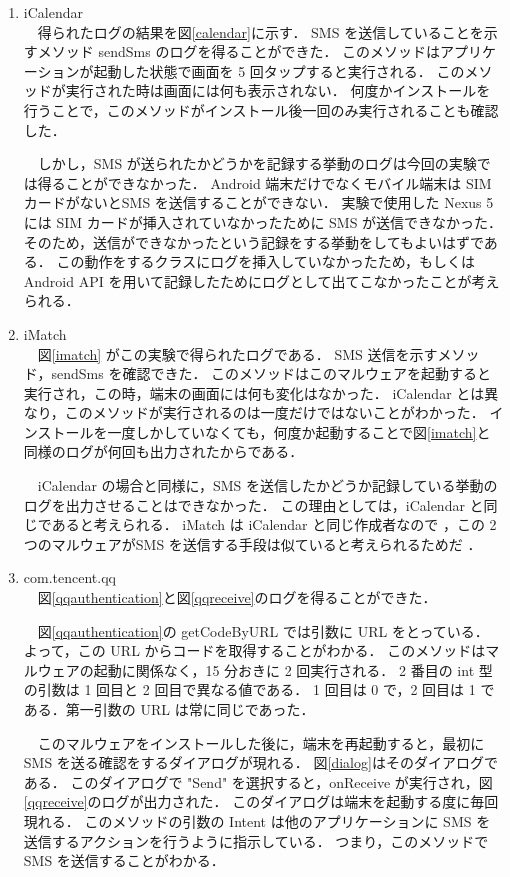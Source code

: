 \begin{enumerate}
\item iCalendar \mbox{}\\
	\ \ 得られたログの結果を図\ref{calendar}に示す．
	SMS を送信していることを示すメソッド sendSms のログを得ることができた．
	このメソッドはアプリケーションが起動した状態で画面を 5 回タップすると実行される．
	このメソッドが実行された時は画面には何も表示されない．
	何度かインストールを行うことで，このメソッドがインストール後一回のみ実行されることも確認した．
	
	\ \ しかし，SMS が送られたかどうかを記録する挙動のログは今回の実験では得ることができなかった．
	Android 端末だけでなくモバイル端末は SIM カードがないとSMS を送信することができない．
	実験で使用した Nexus 5 には SIM カードが挿入されていなかったために SMS が送信できなかった．
	そのため，送信ができなかったという記録をする挙動をしてもよいはずである．
	この動作をするクラスにログを挿入していなかったため，もしくは Android API を用いて記録したためにログとして出てこなかったことが考えられる．
	
\item iMatch \mbox{}\\
	\ \ 図\ref{imatch} がこの実験で得られたログである．
	SMS 送信を示すメソッド，sendSms を確認できた．
	このメソッドはこのマルウェアを起動すると実行され，この時，端末の画面には何も変化はなかった．
	iCalendar とは異なり，このメソッドが実行されるのは一度だけではないことがわかった．
	インストールを一度しかしていなくても，何度か起動することで図\ref{imatch}と同様のログが何回も出力されたからである．
	
	\ \ iCalendar の場合と同様に，SMS を送信したかどうか記録している挙動のログを出力させることはできなかった．
	この理由としては，iCalendar と同じであると考えられる．
	iMatch は iCalendar と同じ作成者なので \cite{icalendar}，この 2 つのマルウェアがSMS を送信する手段は似ていると考えられるためだ ．
	
\item com.tencent.qq \mbox{}\\
	\ \ 図\ref{qqauthentication}と図\ref{qqreceive}のログを得ることができた．
	
	\ \ 図\ref{qqauthentication}の getCodeByURL では引数に URL をとっている．
	よって，この URL からコードを取得することがわかる．
	このメソッドはマルウェアの起動に関係なく，15 分おきに 2 回実行される．
	2 番目の int 型の引数は 1 回目と 2 回目で異なる値である．
	1 回目は 0 で，2 回目は 1 である．第一引数の URL は常に同じであった．
	
	\ \ このマルウェアをインストールした後に，端末を再起動すると，最初に SMS を送る確認をするダイアログが現れる．
	図\ref{dialog}はそのダイアログである．
	このダイアログで "Send" を選択すると，onReceive が実行され，図\ref{qqreceive}のログが出力された．
	このダイアログは端末を起動する度に毎回現れる．
	このメソッドの引数の Intent は他のアプリケーションに SMS を送信するアクションを行うように指示している．
	つまり，このメソッドで SMS を送信することがわかる．
	

\end{enumerate}

